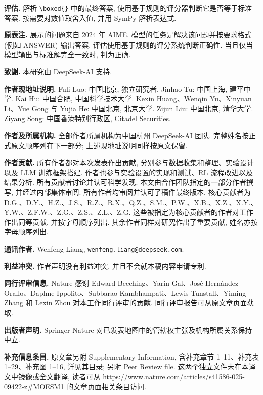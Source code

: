 \noindent\textbf{评估.} 解析 \texttt{\textbackslash boxed\{\}} 中的最终答案, 使用基于规则的评分器判断它是否等于标准答案. 按需要对数值取舍入值, 并用 SymPy 解析表达式.

\noindent\textbf{原表注.} 展示的问题来自 2024 年 AIME. 模型的任务是解决该问题并按要求格式 (例如 ANSWER) 输出答案. 评估使用基于规则的评分系统判断正确性. 当且仅当模型输出与标准解完全一致时, 判为正确.

\label{r1n-author-info}
\noindent\textbf{致谢.} 本研究由 DeepSeek-AI 支持.

\noindent\textbf{作者现地址说明.} Fuli Luo: 中国北京, 独立研究者. Jinhao Tu: 中国上海, 建平中学. Kai Hu: 中国合肥, 中国科学技术大学. Kexin Huang、Wenqin Yu、Xinyuan Li、Yue Gong 与 Yujia He: 中国北京, 北京大学. Zijun Liu: 中国北京, 清华大学. Ziyang Song: 中国香港特别行政区, Citadel Securities.

\noindent\textbf{作者及所属机构.} 全部作者所属机构为中国杭州 DeepSeek-AI 团队. 完整姓名按正式原文顺序列在下一部分; 上述现地址说明同样按原文保留.

\noindent\textbf{作者贡献.} 所有作者都对本次发表作出贡献, 分别参与数据收集和整理、实验设计以及 LLM 训练框架搭建. 作者也参与实验设置的实现和测试、RL 流程改进以及结果分析. 所有贡献者讨论并认可科学发现. 本文由合作团队指定的一部分作者撰写, 并经过内部集体审阅. 所有作者均审阅并认可了稿件最终版本. 核心贡献者为 D.G.、D.Y.、H.Z.、J.S.、R.Z.、R.X.、Q.Z.、S.M.、P.W.、X.B.、X.Z.、X.Y.、Y.W.、Z.F.W.、Z.G.、Z.S.、Z.L.、Z.G. 这些被指定为核心贡献者的作者对工作作出同等贡献, 并按字母顺序列出. 其余作者同样对研究作出了重要贡献, 姓名亦按字母顺序列出.

\noindent\textbf{通讯作者.} Wenfeng Liang, \texttt{wenfeng.liang@deepseek.com}.

\noindent\textbf{利益冲突.} 作者声明没有利益冲突, 并且不会就本稿内容申请专利.

\noindent\textbf{同行评审信息.} Nature 感谢 Edward Beeching、Yarin Gal、José Hernández-Orallo、Daphne Ippolito、Subbarao Kambhampati、Lewis Tunstall、Yiming Zhang 和 Lexin Zhou 对本工作同行评审的贡献. 同行评审报告可从原文章页面获取.

\noindent\textbf{出版者声明.} Springer Nature 对已发表地图中的管辖权主张及机构所属关系保持中立.

\noindent\textbf{补充信息条目.} 原文章另附 Supplementary Information, 含补充章节 1--11、补充表 1--29、补充图 1--16, 详见其目录; 另附 Peer Review file. 这两个独立文件未在本译文中镜像或全文翻译, 读者可从 \url{https://www.nature.com/articles/s41586-025-09422-z#MOESM1} 的文章页面相关条目访问.

